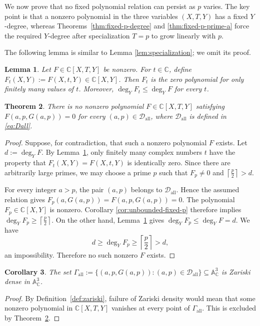 \documentclass[reqno, 12pt]{article}
\numberwithin{equation}{section}
\newtheorem{theorem}{Theorem}[section]
\newtheorem{lemma}[theorem]{Lemma}
\newtheorem{corollary}[theorem]{Corollary}
\theoremstyle{definition}
\newcommand{\Aff}{\mathbb A}
\newcommand{\CC}{\mathbb{C}}
\newcommand{\cD}{\mathcal D}
\begin{document}
We now prove that no fixed polynomial relation can persist as $p$ varies.
The key point is that a nonzero polynomial in the three variables $(X,T,Y)$
has a fixed $Y$-degree, whereas Theorems~\ref{thm:fixed-p-degree} and
\ref{thm:fixed-p-prime-a} force the required $Y$-degree after specialization
$T=p$ to grow linearly with $p$.

The following lemma is similar to Lemma \ref{lem:specialization}; we omit its proof.

\begin{lemma}\label{lem:specialization2}
Let $F\in\CC[X,T,Y]$ be nonzero.  For $t\in\CC$, define $F_t(X,Y):=F(X,t,Y)\in\CC[X,Y]$.
Then $F_t$ is the zero polynomial for only finitely many values of $t$.
Moreover, $\deg_YF_t\le\deg_YF$ for every $t$.
\end{lemma}


\begin{theorem}\label{thm:global-all-a}
There is no nonzero polynomial $F\in\CC[X,T,Y]$ satisfying $F(a,p,G(a,p))=0$ for every $(a,p)\in\cD_{\mathrm{all}}$, where
$\cD_{\mathrm{all}}$ is defined in \cref{eq:Dall}.
\end{theorem}
\begin{proof}
Suppose, for contradiction, that such a nonzero polynomial $F$ exists.  Let $d:=\deg_YF$. By Lemma~\ref{lem:specialization2}, only finitely many complex numbers $t$ have the property that $F_t(X,Y)=F(X,t,Y)$ is identically zero.  Since there are
arbitrarily large primes, we may choose a prime $p$ such that $F_p\ne0$ and $\left\lceil\frac{p}{2}\right\rceil>d$.

For every integer $a>p$, the pair $(a,p)$ belongs to $\cD_{\mathrm{all}}$.  Hence the assumed relation gives $F_p(a,G(a,p))=F(a,p,G(a,p))=0$. The polynomial $F_p\in\CC[X,Y]$ is nonzero.  Corollary
\ref{cor:unbounded-fixed-p} therefore implies $\deg_YF_p\ge\left\lceil\frac{p}{2}\right\rceil$.
On the other hand, Lemma~\ref{lem:specialization2} gives $\deg_YF_p\le\deg_YF=d$.
We have 
\[d\ge\deg_YF_p \ge\left\lceil\frac{p}{2}\right\rceil>d,
\]
an impossibility. Therefore no such nonzero $F$ exists.
\end{proof}

\begin{corollary}\label{cor:zariski-all-a}
The set $\Gamma_{\mathrm{all}}:=\{(a,p,G(a,p)):(a,p)\in\cD_{\mathrm{all}}\}\subseteq\Aff^3_{\CC}$ is Zariski dense in $\Aff^3_{\CC}$.
\end{corollary}
\begin{proof}
By Definition~\ref{def:zariski}, failure of Zariski density would mean that
some nonzero polynomial in $\CC[X,T,Y]$ vanishes at every point of
$\Gamma_{\mathrm{all}}$.  This is excluded by
Theorem~\ref{thm:global-all-a}.
\end{proof}
\end{document}
